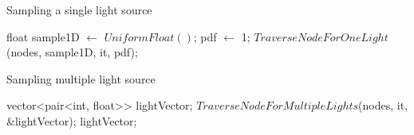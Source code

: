 \begin{algorithm}
	\caption{Sampling a single light source}
	\label{alg:sample1}
	\begin{algorithmic}[1] %
			\State float sample1D $\gets$ $UniformFloat()$;
			\State *pdf $\gets$ 1;
			\State \Return $TraverseNodeForOneLight$(nodes, sample1D, it, pdf);
			\EndProcedure
		\end{algorithmic}
	\end{algorithm}
	
	\begin{algorithm}
		\caption{Sampling multiple light source}
		\label{alg:sample2}
		\begin{algorithmic}[1] %
				\State vector<pair<int, float>> lightVector;
				\State $TraverseNodeForMultipleLights$(nodes, it, \&lightVector);
				\State \Return lightVector;
				\EndProcedure
			\end{algorithmic}
		\end{algorithm}

